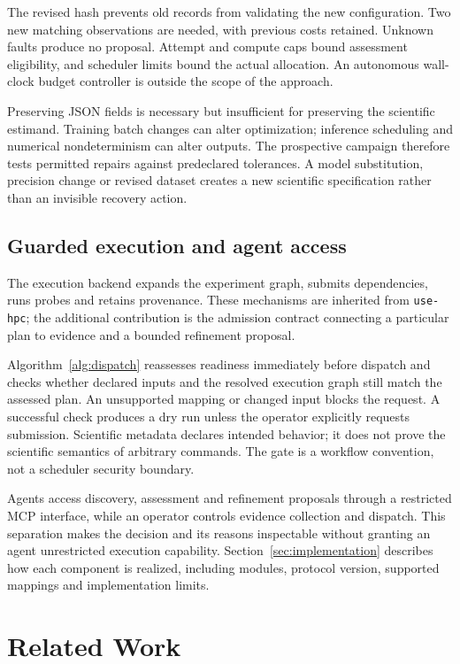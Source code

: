 \documentclass[pdflatex,sn-mathphys-num]{sn-jnl}
\theoremstyle{thmstylethree}
\newcommand{\upstream}{\texttt{use-hpc}}
\begin{document}
The revised hash prevents old records from validating the new configuration. Two new matching observations are needed, with previous costs retained. Unknown faults produce no proposal. Attempt and compute caps bound assessment eligibility, and scheduler limits bound the actual allocation. An autonomous wall-clock budget controller is outside the scope of the approach.

Preserving JSON fields is necessary but insufficient for preserving the scientific estimand. Training batch changes can alter optimization; inference scheduling and numerical nondeterminism can alter outputs. The prospective campaign therefore tests permitted repairs against predeclared tolerances. A model substitution, precision change or revised dataset creates a new scientific specification rather than an invisible recovery action.

\subsection{Guarded execution and agent access}
The execution backend expands the experiment graph, submits dependencies, runs probes and retains provenance. These mechanisms are inherited from \upstream{}; the additional contribution is the admission contract connecting a particular plan to evidence and a bounded refinement proposal.

Algorithm~\ref{alg:dispatch} reassesses readiness immediately before dispatch and checks whether declared inputs and the resolved execution graph still match the assessed plan. An unsupported mapping or changed input blocks the request. A successful check produces a dry run unless the operator explicitly requests submission. Scientific metadata declares intended behavior; it does not prove the scientific semantics of arbitrary commands. The gate is a workflow convention, not a scheduler security boundary.

Agents access discovery, assessment and refinement proposals through a restricted MCP interface, while an operator controls evidence collection and dispatch. This separation makes the decision and its reasons inspectable without granting an agent unrestricted execution capability. Section~\ref{sec:implementation} describes how each component is realized, including modules, protocol version, supported mappings and implementation limits.

\section{Related Work}\label{sec:related}
\end{document}
